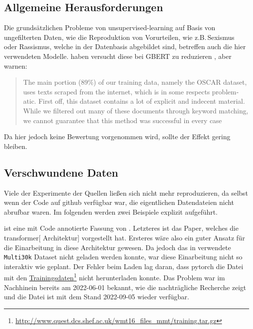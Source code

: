 \subsection{Allgemeine Herausforderungen}
Die grundsätzlichen Probleme von \gls{unsupervised-learning}
auf Basis von ungefilterten Daten,
wie die Reproduktion von Vorurteilen,
wie z.B.\,Sexismus oder Rassismus,
welche in der Datenbasis abgebildet sind,
betreffen auch die hier verwendeten Modelle.
\citeauthor{2010.10906} haben versucht diese bei \gls{GBERT}
zu reduzieren \autocite[3.1]{2010.10906},
aber warnen:
\foreignblockquote{english}[{\autocite[3.1]{2010.10906}}]{ The main portion (89\%) of our training data, namely the OSCAR dataset, uses texts
	scraped from the internet, which is in some respects problematic. First off, this dataset contains a lot of
	explicit and indecent material. While we filtered out many of these documents through keyword matching, we cannot guarantee that this method was successful in every case}

Da hier jedoch keine Bewertung vorgenommen wird,
sollte der Effekt gering bleiben.

\subsection{Verschwundene Daten}

Viele der Experimente der Quellen ließen sich nicht mehr reproduzieren,
da selbst wenn der Code auf \gls{github}
verfügbar war,
die eigentlichen Datendateien nicht abrufbar waren.
Im folgenden werden zwei Beispiele explizit aufgeführt.

 ist eine mit Code annotierte Fassung von .
Letzteres ist das Paper,
welches die \gls{transformer}[ Architektur] vorgestellt hat.
Ersteres wäre also ein guter Ansatz für die Einarbeitung in diese Architektur gewesen.
Da jedoch das in \autocite[Data Loading]{notebook:annotated-transformer} verwendete \texttt{Multi30k} Dataset
nicht geladen werden konnte,
war diese Einarbeitung nicht so interaktiv wie geplant.
Der Fehler beim Laden lag daran,
dass \gls{pytorch}
die Datei mit den \href{http://www.quest.dcs.shef.ac.uk/wmt16_files_mmt/training.tar.gz}{Trainingsdaten}\footnote{\url{http://www.quest.dcs.shef.ac.uk/wmt16_files_mmt/training.tar.gz}}
nicht herunterladen konnte.
Das Problem war im Nachhinein bereits am 2022-06-01 bekannt,
wie die nachträgliche Recherche zeigt\autocite{pytorch:text:issues:1765}
und die Datei ist mit dem Stand 2022-09-05 wieder verfügbar.


